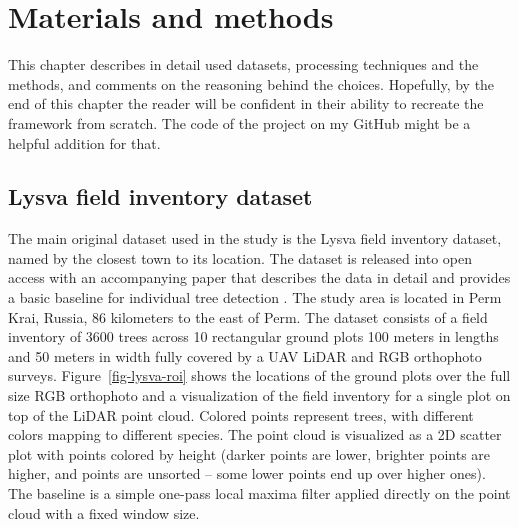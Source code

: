 \chapter{Materials and methods}\label{cap:materials}

This chapter describes in detail used datasets, processing techniques and the methods, and comments on the reasoning behind the choices.
Hopefully, by the end of this chapter the reader will be confident in their ability to recreate the framework from scratch.
The code of the project on my GitHub might be a helpful addition for that.


\section{Lysva field inventory dataset}\label{sec-lysva-dataset}

The main original dataset used in the study is the Lysva field inventory dataset, named by the closest town to its location.
The dataset is released into open access with an accompanying paper that describes the data in detail and provides a basic baseline for individual tree detection \citep{dubrovinExplorationPropertiesPoint2024}.
The study area is located in Perm Krai, Russia, 86 kilometers to the east of Perm.
The dataset consists of a field inventory of 3600 trees across 10 rectangular ground plots 100 meters in lengths and 50 meters in width fully covered by a UAV LiDAR and RGB orthophoto surveys.
Figure~\ref{fig-lysva-roi} shows the locations of the ground plots over the full size RGB orthophoto and a visualization of the field inventory for a single plot on top of the LiDAR point cloud.
Colored points represent trees, with different colors mapping to different species.
The point cloud is visualized as a 2D scatter plot with points colored by height (darker points are lower, brighter points are higher, and points are unsorted – some lower points end up over higher ones).
The baseline is a simple one-pass local maxima filter applied directly on the point cloud with a fixed window size.

